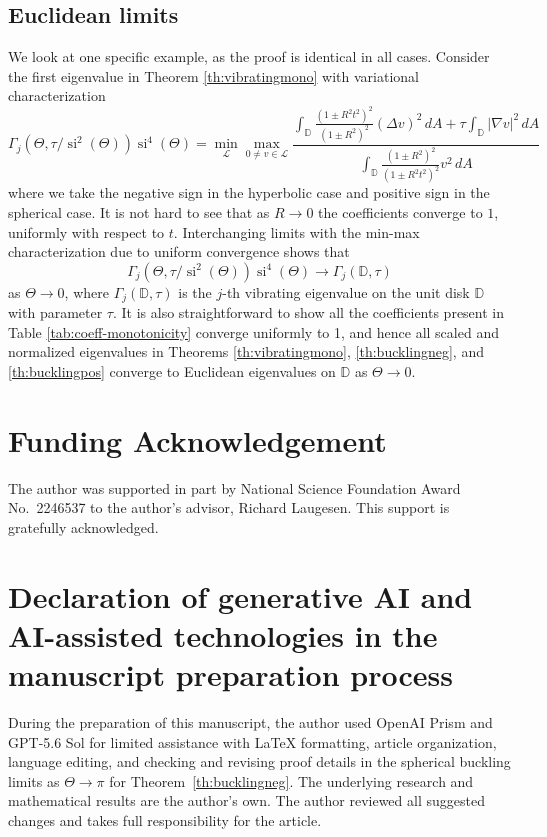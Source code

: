 \documentclass[11pt]{amsart}
\theoremstyle{definition}
\numberwithin{equation}{section}
\newcommand{\lapl}{\Delta}
\newcommand{\grad}{\nabla}
\newcommand{\D}{\mathbb{D}}
\newcommand{\si}{\operatorname{si}}
\begin{document}
\subsection{Euclidean limits}\label{sec:euc_limits_buck_vibr}

We look at one specific example, as the proof is identical in all cases. Consider the first eigenvalue in Theorem \ref{th:vibratingmono} with variational characterization
\[
\Gamma_j(\Theta, \tau/\si^2(\Theta))\si^4(\Theta) =\min_{\mathcal{L}}\max_{0 \neq v \in \mathcal{L}}\dfrac{\displaystyle \int_{\D}\frac{(1\pm R^2t^2)^2}{(1\pm R^2)^2}(\lapl v)^2 \,  dA +  \tau\int_{\D}|\grad v|^2 \, dA}{\displaystyle \int_{\D} \frac{(1\pm R^2)^2}{(1\pm R^2t^2)^2}v^2 \, dA}
\]
where we take the negative sign in the hyperbolic case and positive sign in the spherical case. It is not hard to see that as $R \to 0$ the coefficients converge to $1$, uniformly with respect to $t$. Interchanging limits with the min-max characterization due to uniform convergence shows that
\[
\Gamma_j(\Theta, \tau/\si^2(\Theta))\si^4(\Theta) \to \Gamma_j(\D, \tau) 
\]
 as $\Theta \to 0$, where $\Gamma_j(\D, \tau)$ is the $j$-th vibrating eigenvalue on the unit disk $\D$ with parameter $\tau$. It is also straightforward to show all the coefficients present in Table \ref{tab:coeff-monotonicity} converge uniformly to 1, and hence all scaled and normalized eigenvalues in Theorems \ref{th:vibratingmono}, \ref{th:bucklingneg}, and \ref{th:bucklingpos} converge to Euclidean eigenvalues on $\D$ as $\Theta \to 0$.

\section*{Funding Acknowledgement}

The author was supported in part by National Science Foundation Award No.~2246537 to the author's advisor, Richard Laugesen. This support is gratefully acknowledged.

\section*{Declaration of generative AI and AI-assisted technologies in the manuscript preparation process}

During the preparation of this manuscript, the author used OpenAI Prism and GPT-5.6 Sol for limited assistance with LaTeX formatting, article organization, language editing, and checking and revising proof details in the spherical buckling limits as $\Theta\to\pi$ for Theorem~\ref{th:bucklingneg}. The underlying research and mathematical results are the author's own. The author reviewed all suggested changes and takes full responsibility for the article.
\end{document}

